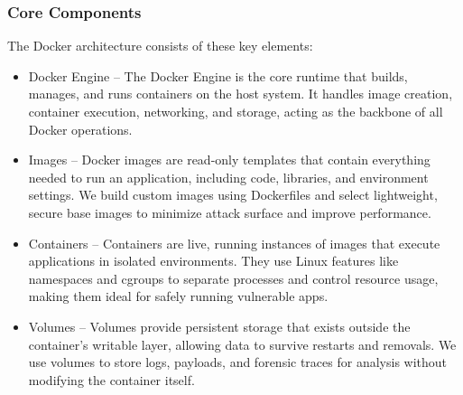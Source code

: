 \documentclass[12pt,titlepage]{article}
\begin{document}
\subsubsection{Core Components}
The Docker architecture consists of these key elements:
  \begin{itemize}
    \item {Docker Engine} – The Docker Engine is the core runtime that builds, manages, and runs containers on the host system. It handles image creation, container execution, networking, and storage, acting as the backbone of all Docker operations.
    \item {Images} – Docker images are read-only templates that contain everything needed to run an application, including code, libraries, and environment settings. We build custom images using Dockerfiles and select lightweight, secure base images to minimize attack surface and improve performance.
    \item {Containers} – Containers are live, running instances of images that execute applications in isolated environments. They use Linux features like namespaces and cgroups to separate processes and control resource usage, making them ideal for safely running vulnerable apps.
    \item {Volumes} – Volumes provide persistent storage that exists outside the container’s writable layer, allowing data to survive restarts and removals. We use volumes to store logs, payloads, and forensic traces for analysis without modifying the container itself.
    \end{itemize}
\end{document}
